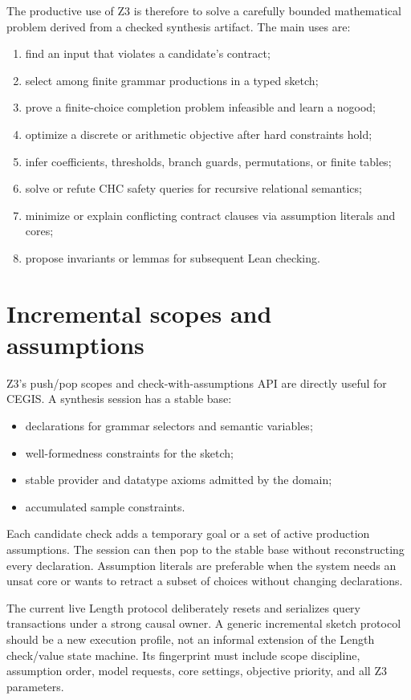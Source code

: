 \documentclass[11pt,oneside]{report}
\begin{document}
The productive use of Z3 is therefore to solve a carefully bounded mathematical problem derived from a checked synthesis artifact. The main uses are:

\begin{enumerate}[leftmargin=2em]
\item find an input that violates a candidate's contract;
\item select among finite grammar productions in a typed sketch;
\item prove a finite-choice completion problem infeasible and learn a nogood;
\item optimize a discrete or arithmetic objective after hard constraints hold;
\item infer coefficients, thresholds, branch guards, permutations, or finite tables;
\item solve or refute CHC safety queries for recursive relational semantics;
\item minimize or explain conflicting contract clauses via assumption literals and cores;
\item propose invariants or lemmas for subsequent Lean checking.
\end{enumerate}

\section{Incremental scopes and assumptions}

Z3's push/pop scopes and check-with-assumptions API are directly useful for CEGIS. A synthesis session has a stable base:

\begin{itemize}[leftmargin=2em]
\item declarations for grammar selectors and semantic variables;
\item well-formedness constraints for the sketch;
\item stable provider and datatype axioms admitted by the domain;
\item accumulated sample constraints.
\end{itemize}

Each candidate check adds a temporary goal or a set of active production assumptions. The session can then pop to the stable base without reconstructing every declaration. Assumption literals are preferable when the system needs an unsat core or wants to retract a subset of choices without changing declarations.

The current live Length protocol deliberately resets and serializes query transactions under a strong causal owner. A generic incremental sketch protocol should be a new execution profile, not an informal extension of the Length check/value state machine. Its fingerprint must include scope discipline, assumption order, model requests, core settings, objective priority, and all Z3 parameters.
\end{document}

